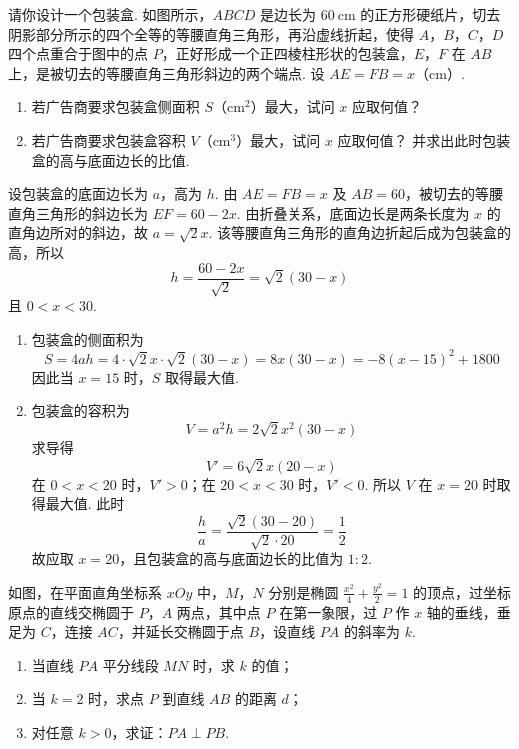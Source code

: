 \begin{problem}
请你设计一个包装盒. 如图所示，\(ABCD\) 是边长为 \(60\mathrm{~cm}\) 的正方形硬纸片，切去阴影部分所示的四个全等的等腰直角三角形，再沿虚线折起，使得 \(A\)，\(B\)，\(C\)，\(D\) 四个点重合于图中的点 \(P\)，正好形成一个正四棱柱形状的包装盒，\(E\)，\(F\) 在 \(AB\) 上，是被切去的等腰直角三角形斜边的两个端点. 设 \(AE=FB=x\)（\(\mathrm{cm}\)）.

\begin{enumerate}
\item 若广告商要求包装盒侧面积 \(S\)（\(\mathrm{cm}^2\)）最大，试问 \(x\) 应取何值？
\item 若广告商要求包装盒容积 \(V\)（\(\mathrm{cm}^3\)）最大，试问 \(x\) 应取何值？ 并求出此时包装盒的高与底面边长的比值.
\end{enumerate}
\end{problem}

\begin{solution}
设包装盒的底面边长为 \(a\)，高为 \(h\). 由 \(AE=FB=x\) 及 \(AB=60\)，被切去的等腰直角三角形的斜边长为 \(EF=60-2x\). 由折叠关系，底面边长是两条长度为 \(x\) 的直角边所对的斜边，故 \(a=\sqrt{2}x\). 该等腰直角三角形的直角边折起后成为包装盒的高，所以
\[
h=\frac{60-2x}{\sqrt{2}}=\sqrt{2}(30-x)
\]
且 \(0<x<30\).

\begin{enumerate}
\item 包装盒的侧面积为
\[
S=4ah=4\cdot\sqrt{2}x\cdot\sqrt{2}(30-x)=8x(30-x)=-8(x-15)^2+1800
\]
因此当 \(x=15\) 时，\(S\) 取得最大值.

\item 包装盒的容积为
\[
V=a^2h=2\sqrt{2}x^2(30-x)
\]
求导得
\[
V'=6\sqrt{2}x(20-x)
\]
在 \(0<x<20\) 时，\(V'>0\)；在 \(20<x<30\) 时，\(V'<0\). 所以 \(V\) 在 \(x=20\) 时取得最大值. 此时
\[
\frac{h}{a}=\frac{\sqrt{2}(30-20)}{\sqrt{2}\cdot20}=\frac{1}{2}
\]
故应取 \(x=20\)，且包装盒的高与底面边长的比值为 \(1:2\).
\end{enumerate}
\end{solution}

\begin{problem}
如图，在平面直角坐标系 \(xOy\) 中，\(M\)，\(N\) 分别是椭圆 \(\frac{x^2}{4}+\frac{y^2}{2}=1\) 的顶点，过坐标原点的直线交椭圆于 \(P\)，\(A\) 两点，其中点 \(P\) 在第一象限，过 \(P\) 作 \(x\) 轴的垂线，垂足为 \(C\)，连接 \(AC\)，并延长交椭圆于点 \(B\)，设直线 \(PA\) 的斜率为 \(k\).

\begin{enumerate}
\item 当直线 \(PA\) 平分线段 \(MN\) 时，求 \(k\) 的值；
\item 当 \(k=2\) 时，求点 \(P\) 到直线 \(AB\) 的距离 \(d\)；
\item 对任意 \(k>0\)，求证：\(PA\perp PB\).
\end{enumerate}
\end{problem}

